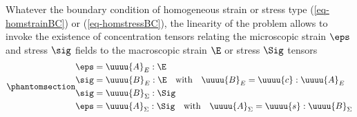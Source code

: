 \documentclass[
  letterpaper,
  DIV=11,
  numbers=noendperiod]{scrreprt}
\begin{document}
Whatever the boundary condition of homogeneous strain or stress type
(\ref{eq-homstrainBC}) or (\ref{eq-homstressBC}), the linearity of the
problem allows to invoke the existence of concentration tensors relating
the microscopic strain \(\eps\) and stress \(\sig\) fields to the
macroscopic strain \(\E\) or stress \(\Sig\) tensors
\begin{equation}\phantomsection\label{eq-conc}{\begin{aligned}
\eps & =  \uuuu{A}_E:\E \\
\sig & =  \uuuu{B}_E:\E \quad\textrm{with}\quad \uuuu{B}_E=\uuuu{c}:\uuuu{A}_E \\
\sig & =  \uuuu{B}_\Sigma:\Sig \\
\eps & =  \uuuu{A}_\Sigma:\Sig \quad\textrm{with}\quad \uuuu{A}_\Sigma=\uuuu{s}:\uuuu{B}_\Sigma 
\end{aligned}}\end{equation}
\end{document}
